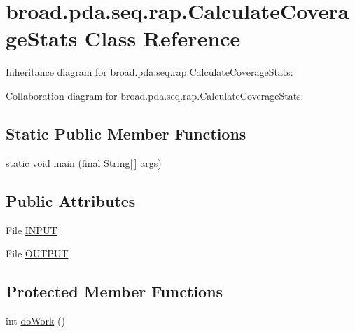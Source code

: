 \hypertarget{classbroad_1_1pda_1_1seq_1_1rap_1_1_calculate_coverage_stats}{\section{broad.\+pda.\+seq.\+rap.\+Calculate\+Coverage\+Stats Class Reference}
\label{classbroad_1_1pda_1_1seq_1_1rap_1_1_calculate_coverage_stats}
}


Inheritance diagram for broad.\+pda.\+seq.\+rap.\+Calculate\+Coverage\+Stats\+:


Collaboration diagram for broad.\+pda.\+seq.\+rap.\+Calculate\+Coverage\+Stats\+:
\subsection*{Static Public Member Functions}
\begin{DoxyCompactItemize}
\item 
static void \hyperlink{classbroad_1_1pda_1_1seq_1_1rap_1_1_calculate_coverage_stats_acfaa1394e958eb60a3baa83db8b5a874}{main} (final String\mbox{[}$\,$\mbox{]} args)
\end{DoxyCompactItemize}
\subsection*{Public Attributes}
\begin{DoxyCompactItemize}
\item 
File \hyperlink{classbroad_1_1pda_1_1seq_1_1rap_1_1_calculate_coverage_stats_af99791ff675fe2b297a8eec48211796e}{I\+N\+P\+U\+T}
\item 
File \hyperlink{classbroad_1_1pda_1_1seq_1_1rap_1_1_calculate_coverage_stats_ac50a4cf5dec9ef41a42a9b3555959874}{O\+U\+T\+P\+U\+T}
\end{DoxyCompactItemize}
\subsection*{Protected Member Functions}
\begin{DoxyCompactItemize}
\item 
int \hyperlink{classbroad_1_1pda_1_1seq_1_1rap_1_1_calculate_coverage_stats_abd8e932b6b547e054edca857e80bc048}{do\+Work} ()
\end{DoxyCompactItemize}


